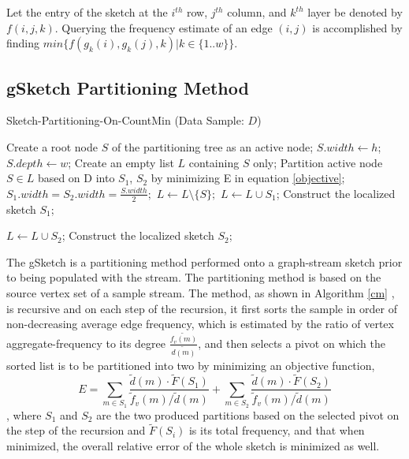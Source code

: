Let the entry of the sketch at the $i^{th}$ row, $j^{th}$ column, and $k^{th}$ layer be denoted by $f(i,j,k)$. Querying the frequency estimate of an edge $(i,j)$ is accomplished by finding $min\{f(g_k(i),g_k(j),k)|k \in \{1..w\}\}$.

\subsection{gSketch Partitioning Method}
\begin{algorithm}
\caption{Sketch-Partitioning-On-CountMin \cite{DBLP} (Data Sample: $D$)}\label{cm}
\begin{algorithmic}[1]

\State Create a root node $S$ of the partitioning tree as an
active node;
\State $S.width \gets h$;
\State $S.depth \gets w$;
\State Create an empty list $L$ containing $S$ only;
\State Partition active node $S \in L$ based on D into $S_1$, $S_2$ by minimizing E in equation \ref{objective};
\State $S_1.width = S_2.width = \frac{S.width}{2};$
\State $L \gets L \setminus \{ S \};$
\State $L \gets L \cup S_1$;
\Else
\State Construct the localized sketch $S_1$;
\EndIf

\State $L \gets L \cup S_2$;
\Else
\State Construct the localized sketch $S_2$;
\EndIf

\EndWhile

\end{algorithmic}
\end{algorithm}
The gSketch \cite{DBLP} is a partitioning method performed onto a graph-stream sketch prior to being populated with the stream. The partitioning method is based on the source vertex set of a sample stream. The method, as shown in Algorithm \ref{cm} \cite{DBLP}, is recursive and on each step of the recursion, it first sorts the sample in order of non-decreasing average edge frequency, which is estimated by the ratio of vertex aggregate-frequency to its degree $\frac{\tilde{f_v(m)}}{\tilde{d(m)}}$, and then selects a pivot on which the sorted list is to be partitioned into two by minimizing an objective function,
\begin{equation}
\label{objective}
E = \sum_{m \in S_1} \frac{\tilde{d}(m) \cdot \tilde{F}(S_1)}{\tilde{f}_v(m) / \tilde{d}(m)} + \sum_{m \in S_2} \frac{\tilde{d}(m) \cdot \tilde{F}(S_2)}{\tilde{f}_v(m) / \tilde{d}(m)}
\end{equation}, where $S_1$ and $S_2$ are the two produced partitions based on the selected pivot on the step of the recursion and $\tilde{F}(S_i)$ is its total frequency, and that when minimized, the overall relative error of the whole sketch is minimized as well.

